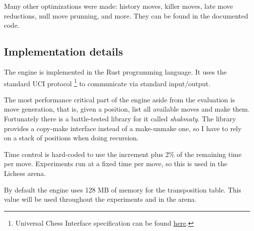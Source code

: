 Many other optimizations were made: history moves, killer moves, late move reductions, null move prunning, and more. They can be found in the documented code.


\subsection{Implementation details}


The engine is implemented in the Rust programming language. It uses the standard UCI protocol \footnote{Universal Chess Interface specification can be found \href{https://www.shredderchess.com/chess-features/uci-universal-chess-interface.html}{here}.} to communicate via standard input/output.

The most performance critical part of the engine aside from the evaluation is move generation, that is, given a position, list all available moves and make them.
Fortunately there is a battle-tested library for it called \textit{shakmaty}. The library provides a copy-make interface instead of a make-unmake one, so I have to rely on a stack of positions when doing recursion.

Time control is hard-coded to use the increment plus 2\% of the remaining time per move. Experiments run at a fixed time per move, so this is used in the Lichess arena.

By default the engine uses 128 MB of memory for the transposition table. This value will be used throughout the experiments and in the arena.

